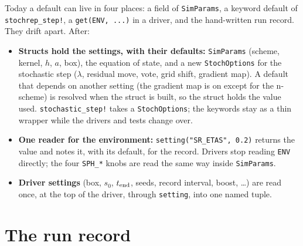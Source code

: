 \documentclass[11pt,aps,preprint,nofootinbib,superscriptaddress,tightenlines]{revtex4-2}
\newcommand{\file}[1]{\texttt{#1}}
\begin{document}
Today a default can live in four places: a field of \file{SimParams}, a keyword default of
\file{stochrep\_step!}, a \file{get(ENV, ...)} in a driver, and the hand-written run record.
They drift apart.  After:
\begin{itemize}
\item \textbf{Structs hold the settings, with their defaults:} \file{SimParams} (scheme,
  kernel, $h$, $a$, box), the equation of state, and a new \file{StochOptions} for the
  stochastic step ($\lambda$, residual move, vote, grid shift, gradient map).  A default that
  depends on another setting (the gradient map is on except for the n-scheme) is resolved
  when the struct is built, so the struct holds the value used.
  \file{stochastic\_step!} takes a \file{StochOptions}; the keywords stay as a thin wrapper
  while the drivers and tests change over.
\item \textbf{One reader for the environment:} \file{setting("SR\_ETAS", 0.2)} returns the value
  and notes it, with its default, for the record.  Drivers stop reading \file{ENV} directly;
  the four \file{SPH\_*} knobs are read the same way inside \file{SimParams}.
\item \textbf{Driver settings} (box, $s_0$, $t_{\rm end}$, seeds, record interval, boost, \dots) are
  read once, at the top of the driver, through \file{setting}, into one named tuple.
\end{itemize}

\section{The run record}
\label{sec:record}
\end{document}
